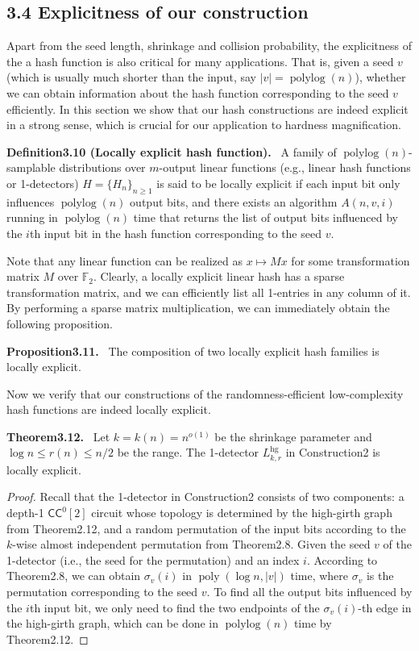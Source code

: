 \documentclass[10pt,a4paper]{article}
\newenvironment{authorclaim}[1]{\par\medskip\noindent\textbf{#1.}\ }{\par\medskip}
\begin{document}
\subsection*{3.4 Explicitness of our construction}
Apart from the seed length, shrinkage and collision probability, the explicitness of the a hash function is also critical for many applications. That is, given a seed $v$ (which is usually much shorter than the input, say $|v|=\operatorname{polylog}(n)$), whether we can obtain information about the hash function corresponding to the seed $v$ efficiently. In this section we show that our hash constructions are indeed explicit in a strong sense, which is crucial for our application to hardness magnification.
\begin{authorclaim}{Definition3.10 (Locally explicit hash function)}
A family of $\operatorname{polylog}(n)$-samplable distributions over $m$-output linear functions (e.g., linear hash functions or 1-detectors) $H=\{H_n\}_{n\ge1}$ is said to be locally explicit if each input bit only influences $\operatorname{polylog}(n)$ output bits, and there exists an algorithm $A(n,v,i)$ running in $\operatorname{polylog}(n)$ time that returns the list of output bits influenced by the $i$th input bit in the hash function corresponding to the seed $v$.
\end{authorclaim}
Note that any linear function can be realized as $x\mapsto Mx$ for some transformation matrix $M$ over $\mathbb F_2$. Clearly, a locally explicit linear hash has a sparse transformation matrix, and we can efficiently list all 1-entries in any column of it. By performing a sparse matrix multiplication, we can immediately obtain the following proposition.
\begin{authorclaim}{Proposition3.11}
The composition of two locally explicit hash families is locally explicit.
\end{authorclaim}
Now we verify that our constructions of the randomness-efficient low-complexity hash functions are indeed locally explicit.
\begin{authorclaim}{Theorem3.12}
Let $k=k(n)=n^{o(1)}$ be the shrinkage parameter and $\log n\le r(n)\le n/2$ be the range. The 1-detector $L^{\mathrm{hg}}_{k,r}$ in Construction2 is locally explicit.
\end{authorclaim}
\begin{proof}
Recall that the 1-detector in Construction2 consists of two components: a depth-1 $\mathsf{CC}^0[2]$ circuit whose topology is determined by the high-girth graph from Theorem2.12, and a random permutation of the input bits according to the $k$-wise almost independent permutation from Theorem2.8. Given the seed $v$ of the 1-detector (i.e., the seed for the permutation) and an index $i$. According to Theorem2.8, we can obtain $\sigma_v(i)$ in $\operatorname{poly}(\log n,|v|)$ time, where $\sigma_v$ is the permutation corresponding to the seed $v$. To find all the output bits influenced by the $i$th input bit, we only need to find the two endpoints of the $\sigma_v(i)$-th edge in the high-girth graph, which can be done in $\operatorname{polylog}(n)$ time by Theorem2.12.
\end{proof}
\end{document}
